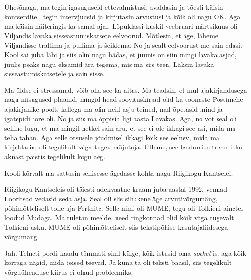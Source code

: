 Ühesõnaga, ma tegin igasuguseid ettevalmistusi, avaldasin ja tõesti käisin 
kontserditel, tegin intervjuusid ja kirjutasin arvustusi ja kõik oli nagu OK. 
Aga ma käisin näiteringis ka samal ajal. Lõpuklassi kuskil veebruari-märtsikuus 
oli Viljandis lavaka sisseastumiskatsete 
eelvoorud. Mõtlesin, et äge, läheme Viljandisse trallima ja pullima ja 
šeiklema. No ja sealt eelvoorust me sain edasi. Kool sai juba läbi ja siis olin 
nagu hädas, et juunis on siin mingi lavaka asjad,  juulis peaks nagu eksamid 
ära tegema, mis ma siis teen. Läksin lavaka sisseastumiskatsetele ja sain sisse.

Ma üldse ei stressanud, võib olla see ka aitas. Ma teadsin, et mul 
ajakirjandusega nagu niisugused plaanid, mingid head soovituskirjad olid ka 
toonaste Postimehe ajakirjanike poolt, kellega ma olin neid 
asju teinud, nad õpetasid mind ja igatepidi tore oli. No ja siis ma õppisin 
ligi aasta Lavakas. Aga, no vot seal oli selline lugu, et ma 
mingil hetkel sain aru, et see ei ole ikkagi see asi, mida ma teha tahan. Aga 
selle otsusele jõudmisel ikkagi  kõik see eelnev, mida ma kirjeldasin, oli 
tegelikult väga tugev mõjutaja. Ütleme,  see lendamise trenn ikka aknast 
paistis tegelikult kogu aeg. 

Kooli kõrvalt ma sattusin sellisesse ägedasse kohta nagu Riigikogu 
Kantselei.


Riigikogu Kantseleis oli täiesti adekvaatne kraam juba aastal 1992, vennad  
Looritsad vedasid seda asja. Seal oli siis  sihukene  äge arvutivõrgumäng, 
põhimõtteliselt tolle aja Fortnite. Selle nimi oli 
MUME, tegu oli Tolkieni ainetel loodud 
Mudaga. Ma tuletan meelde, need ringkonnad olid kõik väga 
tugevalt Tolkieni usku. MUME oli  põhimõtteliselt siis tekstipõhise 
kasutajaliidesega võrgumäng. 


Jah. Telneti pordi kaudu tõmmati sind külge,  kõik istusid oma 
\emph{socket}'is, aga kõik korraga nägid, mida teised teevad. Ja kuna ta oli 
teksti baasil, siis tegelikult võrguühenduse kiirus ei olnud probleemiks.

